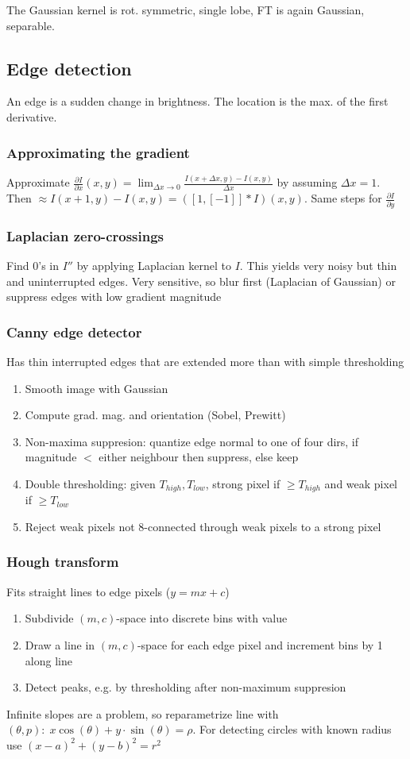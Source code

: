 \documentclass[a4paper,10pt]{article}
\begin{document}
The Gaussian kernel is rot. symmetric, single lobe, FT is again Gaussian, separable.

\subsection{Edge detection}
An edge is a sudden change in brightness. The location is the max. of the first derivative.
\subsubsection{Approximating the gradient} Approximate \( \frac{\partial I}{\partial x}(x,y) = \lim_{\Delta x \to 0} \frac{I(x + \Delta x, y) - I(x,y)}{\Delta x} \) by assuming \( \Delta x = 1 \). Then \( \approx I(x+1, y) - I(x,y) = ([1,[-1]] * I)(x,y) \). Same steps for \( \frac{\partial I}{\partial y} \)
\subsubsection{Laplacian zero-crossings} Find 0's in \( I'' \) by applying Laplacian kernel to \( I \). This yields very noisy but thin and uninterrupted edges. Very sensitive, so blur first (Laplacian of Gaussian) or suppress edges with low gradient magnitude
\subsubsection{Canny edge detector} Has thin interrupted edges that are extended more than with simple thresholding
    \begin{enumerate}
	\item Smooth image with Gaussian
	\item Compute grad. mag. and orientation (Sobel, Prewitt)
	\item Non-maxima suppresion: quantize edge normal to one of four dirs, if magnitude \( <\) either neighbour then suppress, else keep
	\item Double thresholding: given \( T_{high}, T_{low} \), strong pixel if \( \ge T_{high} \) and weak pixel if \( \ge T_{low} \) 
	\item Reject weak pixels not 8-connected through weak pixels to a strong pixel
    \end{enumerate}
\subsubsection{Hough transform} Fits straight lines to edge pixels (\( y = mx + c \))
    \begin{enumerate}
	\item Subdivide \( (m, c) \)-space into discrete bins with value 
	\item Draw a line in \( (m,c) \)-space for each edge pixel and increment bins by 1 along line
	\item Detect peaks, e.g. by thresholding after non-maximum suppresion
    \end{enumerate}
    Infinite slopes are a problem, so reparametrize line with \( (\theta , p): \; x \cos (\theta ) + y \cdot \sin (\theta ) = \rho  \). For detecting circles with known radius use \( (x-a)^2+(y-b)^2 = r^2 \)
\end{document}
